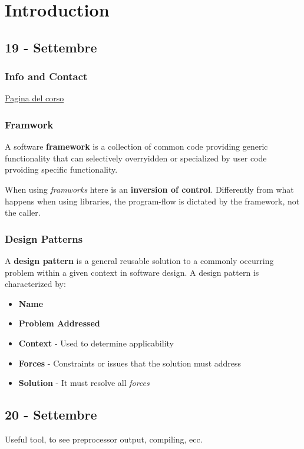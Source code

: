 \chapter{Introduction}
\section{19 - Settembre}
\subsection{Info and Contact}

\href{https://pages.di.unipi.it/corradini/Didattica/AP-23/}{Pagina del corso}

\subsection{Framwork}
A software \textbf{framework} is a collection of common code providing generic functionality that can selectively overryidden or specialized by user code prvoiding specific functionality.

When using \textit{framworks} htere is an \textbf{inversion of control}.
Differently from what happens when using libraries,
the program-flow is dictated by the framework, not the caller.

\subsection{Design Patterns}
A \textbf{design pattern} is a general reusable solution to a commonly occurring problem within a given context in software design. 
A design pattern is characterized by:
\begin{itemize}
    \item \textbf{Name}
	\item \textbf{Problem Addressed}
	\item \textbf{Context} - Used to determine applicability
	\item \textbf{Forces} - Constraints or issues that the solution must address
	\item \textbf{Solution} - It must resolve all \textit{forces}
\end{itemize}

\section{20 - Settembre}
Useful tool, to see preprocessor output, compiling, ecc.
